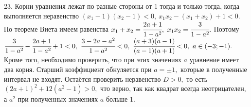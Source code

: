23. Корни уравнения лежат по разные стороны от 1 тогда и только тогда, когда выполняется неравенство $(x_1-1)(x_2-1)<0,\ x_1x_2-(x_1+x_2)+1<0.$ По теореме Виета имеем равенства $x_1+x_2=\cfrac{2a+1}{1-a^2},\ x_1x_2=\cfrac{3}{1-a^2}.$ Поэтому $\cfrac{3}{1-a^2}-\cfrac{2a+1}{1-a^2}+1<0,\
\cfrac{3-2a-a^2}{1-a^2}<0,\ \cfrac{(a+3)(a-1)}{(a-1)(a+1)}<0,\ a\in(-3;-1).$ Кроме того, необходимо проверить, что при этих значениях $a$ уравнение имеет два корня. Старший коэффициент обнуляется при $a=\pm1,$ которые в полученные интервал не входят. Остаётся проверить неравенство $D>0,$ то есть $(2a+1)^2+12(a^2-1)>0,$ что верно, так как квадрат всегда неотрицателен, а $a^2$ при полученных значениях $a$ больше 1.\\
